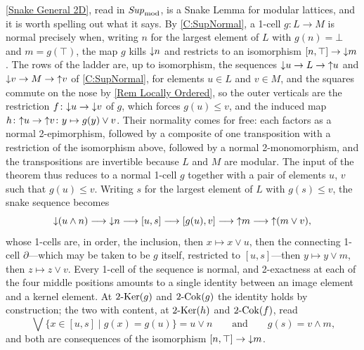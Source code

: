 \begin{remark}
  \label{Rem Lattice Snake}
  \thex\ref{Snake General 2D}, read in \(\mathit{Sup}_{\mathrm{mod}}\), is a Snake Lemma for modular lattices, and it is worth spelling out what it says. By \corx\ref{C:SupNormal}, a 1-cell \(g\colon L\to M\) is normal precisely when, writing \(n\) for the largest element of \(L\) with \(g(n)=\bot\) and \(m=g(\top)\), the map \(g\) kills \({\downarrow}n\) and restricts to an isomorphism \([n,\top]\to{\downarrow}m\). The rows of the ladder are, up to isomorphism, the sequences \({\downarrow}u\to L\to{\uparrow}u\) and \({\downarrow}v\to M\to{\uparrow}v\) of \corx\ref{C:SupNormal}, for elements \(u\in L\) and \(v\in M\), and the squares commute on the nose by \remx\ref{Rem Locally Ordered}, so the outer verticals are the restriction \(f\colon{\downarrow}u\to{\downarrow}v\) of \(g\), which forces \(g(u)\leq v\), and the induced map \(h\colon{\uparrow}u\to{\uparrow}v\colon y\mapsto g(y)\vee v\). Their normality comes for free: each factors as a normal 2-epimorphism, followed by a composite of one transposition with a restriction of the isomorphism above, followed by a normal 2-monomorphism, and the transpositions are invertible because \(L\) and \(M\) are modular. The input of the theorem thus reduces to a normal 1-cell \(g\) together with a pair of elements \(u\), \(v\) such that \(g(u)\leq v\). Writing \(s\) for the largest element of \(L\) with \(g(s)\leq v\), the snake sequence becomes
	\[
		{\downarrow}(u\wedge n)\longrightarrow{\downarrow}n\longrightarrow[u,s]\longrightarrow[g(u),v]\longrightarrow{\uparrow}m\longrightarrow{\uparrow}(m\vee v)\text{,}
	\]
	whose 1-cells are, in order, the inclusion, then \(x\mapsto x\vee u\), then the connecting 1-cell \(\partial\)---which may be taken to be \(g\) itself, restricted to \([u,s]\)---then \(y\mapsto y\vee m\), then \(z\mapsto z\vee v\). Every 1-cell of the sequence is normal, and 2-exactness at each of the four middle positions amounts to a single identity between an image element and a kernel element. At \(2\text{-}\mathrm{Ker}(g)\) and \(2\text{-}\mathrm{Cok}(g)\) the identity holds by construction; the two with content, at \(2\text{-}\mathrm{Ker}(h)\) and \(2\text{-}\mathrm{Cok}(f)\), read
	\[
		\bigvee\{x\in[u,s]\mid g(x)=g(u)\}=u\vee n\qquad\text{and}\qquad g(s)=v\wedge m\text{,}
	\]
	and both are consequences of the isomorphism \([n,\top]\to{\downarrow}m\).
\end{remark}


